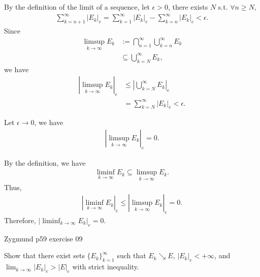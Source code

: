 \documentclass[UTF8,a4paper,10pt]{article}
\begin{document}
  \begin{solution}

  By the definition of the limit of a sequence, let \(\epsilon>0\), there exists \(N\) s.t. \(\forall n\geq N\),
  \begin{equation*}
    \begin{aligned}
      \sum_{k=n+1}^{\infty}|E_k|_e = \sum_{k=1}^{\infty}|E_k|_e - \sum_{k=n}^{\infty}|E_k|_e < \epsilon.
    \end{aligned}
  \end{equation*}
Since
  \begin{equation*}
    \begin{aligned}
      \limsup_{k\to\infty}E_k &:= \bigcap_{n=1}^{\infty}  \bigcup_{k=n}^{\infty} E_k\\
      &\subseteq \bigcup_{k=N}^{\infty} E_k,
    \end{aligned}
  \end{equation*}
  we have
  \begin{equation*}
    \begin{aligned}
      |\limsup_{k\to\infty}E_k|_e&\leq |\bigcup_{k=N}^{\infty} E_k|_e\\
      &=\sum_{k=N}^{\infty}|E_k|_e <\epsilon.
    \end{aligned}
  \end{equation*}

  Let \(\epsilon\to 0\), we have
  \begin{equation*}
    \begin{aligned}
      |\limsup_{k\to\infty}E_k|_e=0.
    \end{aligned}
  \end{equation*}

  \dotfill

  By the definition, we have
  \begin{equation*}
    \begin{aligned}
      \liminf_{k\to\infty}E_k \subseteq \limsup_{k\to\infty}E_k.
    \end{aligned}
  \end{equation*}
Thus, 
\begin{equation*}
  \begin{aligned}
    |\liminf_{k\to\infty}E_k|_e \leq |\limsup_{k\to\infty}E_k|_e = 0.
  \end{aligned}
\end{equation*}
Therefore, \( |\liminf_{k\to\infty}E_k|_e = 0\).


  \end{solution}


  \begin{Problem}[]{Zygmund p59 exercise 09}

    Show that there exist sets \(\{E_k\}_{k=1}^{\infty}\) such that \(E_k \searrow  E\), \(|E_k|_e < +\infty\), and \(\lim_{k\to\infty} |E_k|_e > |E|_e\) with strict inequality.
  \end{Problem}
\end{document}
